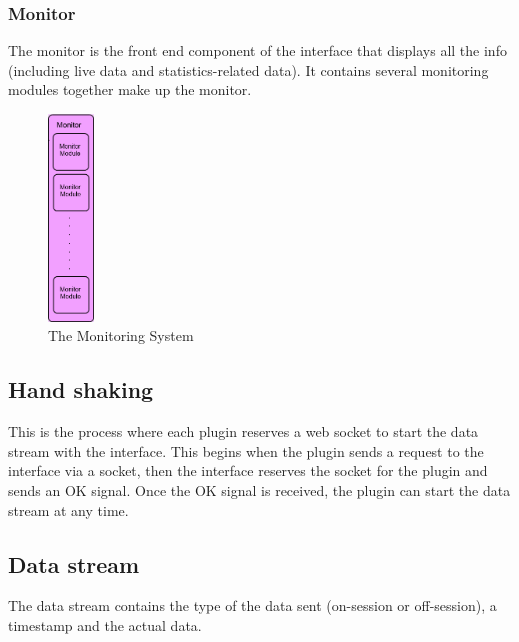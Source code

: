 \documentclass[a4paper]{article}
\begin{document}
\subsubsection{Monitor}
The monitor is the front end component of the interface that displays all the info (including live data and statistics-related data). It contains several monitoring modules together make up the monitor.

\begin{figure}[h!]
\centering
\includegraphics[height=55mm]{Monitor.png}
\caption{The Monitoring System}
\label{threadsVsSync}
\end{figure}

\subsection{Hand shaking}
This is the process where each plugin reserves a web socket to start the data stream with the interface. This begins when the plugin sends a request to the interface via a socket, then the interface reserves the socket for the plugin and sends an OK signal. Once the OK signal is received, the plugin can start the data stream at any time.

\subsection{Data stream}
The data stream contains the type of the data sent (on-session or off-session), a timestamp and the actual data.
\end{document}
